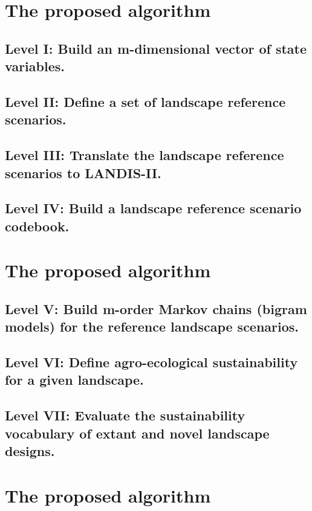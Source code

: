 \documentclass[
paper=128mm:96mm, %
fontsize=11pt, %
pagesize, %
parskip=half-, %
]{scrartcl} %
\theoremstyle{mythmstyle} %
\begin{document}
\clearpage
\section{The proposed algorithm}
\subsection{Level I: Build an m-dimensional vector of state variables.}
\subsection{Level II: Define a set of landscape reference scenarios.}
\subsection{Level III: Translate the landscape reference scenarios to LANDIS-II.}
\subsection{Level IV: Build a landscape reference scenario codebook.}
\clearpage
\section{The proposed algorithm}
\subsection{Level V: Build m-order Markov chains (bigram models) for the reference landscape scenarios.}
\subsection{Level VI: Define agro-ecological sustainability for a given landscape.}
\subsection{Level VII: Evaluate the sustainability vocabulary of extant and novel landscape designs.}
\clearpage
\section{The proposed algorithm}
\end{document}
